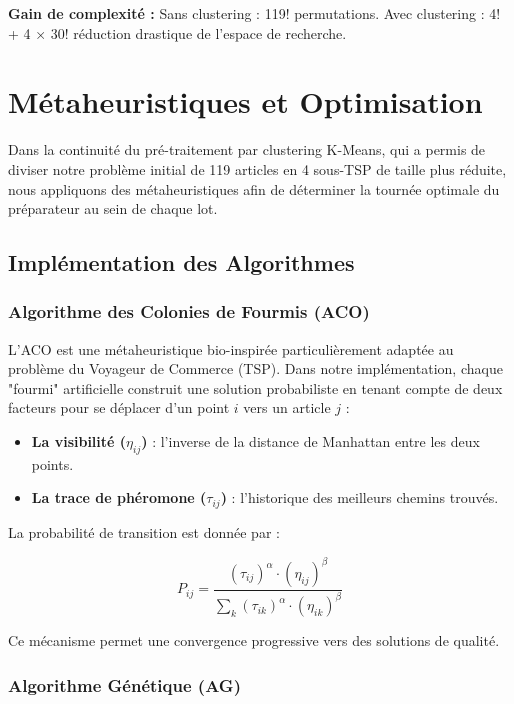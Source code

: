 \documentclass[a4paper, 12pt, twoside]{report}
\begin{document}
\textbf{Gain de complexité :} Sans clustering : 119! permutations. Avec clustering : 4! + 4 × 30! réduction drastique de l'espace de recherche.

\chapter{Métaheuristiques et Optimisation}

Dans la continuité du pré-traitement par clustering K-Means, qui a permis de diviser notre problème initial de 119 articles en 4 sous-TSP de taille plus réduite, nous appliquons des métaheuristiques afin de déterminer la tournée optimale du préparateur au sein de chaque lot.

\section{Implémentation des Algorithmes}

\subsection{Algorithme des Colonies de Fourmis (ACO)}

L’ACO est une métaheuristique bio-inspirée particulièrement adaptée au problème du Voyageur de Commerce (TSP). Dans notre implémentation, chaque "fourmi" artificielle construit une solution probabiliste en tenant compte de deux facteurs pour se déplacer d’un point $i$ vers un article $j$ :

\begin{itemize}
    \item \textbf{La visibilité ($\eta_{ij}$)} : l’inverse de la distance de Manhattan entre les deux points.
    \item \textbf{La trace de phéromone ($\tau_{ij}$)} : l’historique des meilleurs chemins trouvés.
\end{itemize}

La probabilité de transition est donnée par :

$$
P_{ij} = \frac{(\tau_{ij})^\alpha \cdot (\eta_{ij})^\beta}{\sum_{k} (\tau_{ik})^\alpha \cdot (\eta_{ik})^\beta}
$$

Ce mécanisme permet une convergence progressive vers des solutions de qualité.

\subsection{Algorithme Génétique (AG)}
\end{document}
